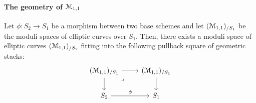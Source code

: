                 \paragraph{The geometry of \texorpdfstring{$\mathcal{M}_{1, 1}$}{}}
                    \begin{proposition} \label{prop: base_changes_of_moduli_spaces_of_elliptic_curves}
                        Let $\phi: S_2 \to S_1$ be a morphism between two base schemes and let $(\mathcal{M}_{1, 1})_{/S_1}$ be the  moduli spaces of elliptic curves over $S_1$. Then, there exists a moduli space of elliptic curves $(\mathcal{M}_{1, 1})_{/S_2}$ fitting into the following pullback square of geometric stacks:
                            $$
                                \begin{tikzcd}
                                	{(\calM_{1, 1})_{/S_1}} & {(\calM_{1, 1})_{/S_1}} \\
                                	{S_2} & {S_1}
                                	\arrow[from=1-2, to=2-2]
                                	\arrow[from=1-1, to=2-1]
                                	\arrow["{\phi}", from=2-1, to=2-2]
                                	\arrow["{}", from=1-1, to=1-2]
                                	\arrow["\lrcorner"{anchor=center, pos=0.125}, draw=none, from=1-1, to=2-2]
                                \end{tikzcd}
                            $$
                    \end{proposition}
